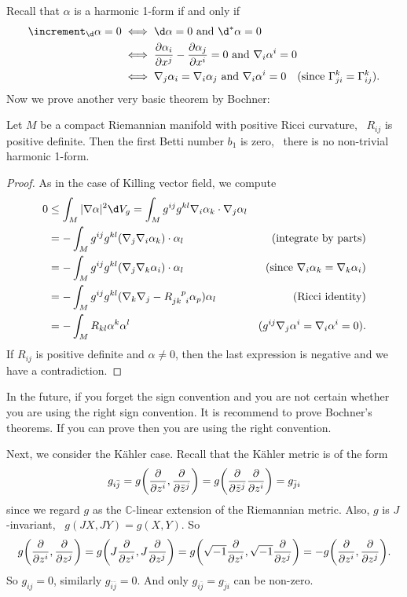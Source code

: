 \documentclass[12pt]{article}
\begin{document}
Recall that \(\alpha\) is a harmonic 1-form if and only if
\begin{align*}
  \lap_{\dd{}}\alpha=0&\iff \dd{\alpha}=0\text{ and }\dd{}^*\alpha=0 \\
  &\iff\pdv{\alpha_i}{x^j}-\pdv{\alpha_j}{x^i}=0\text{ and }\nabla_i\alpha^i=0 \\
  &\iff \nabla_j\alpha_i=\nabla_i \alpha_j\text{ and }\nabla_i \alpha^i=0
  \quad (\text{since }\Gamma_{ji}^k=\Gamma_{ij}^k)
.\end{align*} 
Now we prove another very basic theorem by Bochner:
\begin{theorem}
  Let \(M\) be a compact Riemannian manifold with positive Ricci curvature, \ie\ 
  \(R_{ij}\) is positive definite. Then the first Betti number \(b_1\) is zero,
  \ie\ there is no non-trivial harmonic 1-form.
\end{theorem}
\begin{proof}
  As in the case of Killing vector field, we compute
  \begin{align*}
    0&\le\int_{M}|\nabla \alpha|^2\dd{V_g}=\int_{M}g^{ij}g^{kl}\nabla_i \alpha_k
    \cdot \nabla_j \alpha_l \\
    &=-\int_{M}g^{ij}g^{kl}(\nabla_j \nabla_i \alpha_k)\cdot \alpha_l
    &(\text{integrate by parts}) \\
    &=-\int_{M}g^{ij}g^{kl}(\nabla_j \nabla_k \alpha_i) \cdot \alpha_l
    &(\text{since }\nabla_i\alpha_k=\nabla_k\alpha_i) \\
    &=-\int_{M}g^{ij}g^{kl}(\nabla_k\nabla_j-R\indices{_{jk}^p_i}\alpha_p)
    \alpha_l & (\text{Ricci identity}) \\
    &=-\int_{M}R_{kl}\alpha^k \alpha^l
    &(g^{ij}\nabla_j \alpha^i=\nabla_i \alpha^i=0)
  .\end{align*}
  If \(R_{ij}\) is positive definite and \(\alpha\neq 0\), then the last
  expression is negative and we have a contradiction. 
\end{proof}

In the future, if you forget the sign convention and you are not certain
whether you are using the right sign convention. It is recommend to prove
Bochner's theorems. If you can prove then you are using the right convention.

Next, we consider the Kähler case. Recall that the Kähler metric is of the
form \[
  g_{i\bar{j}}=g\left(\pd{z^i},\pd{\bar{z}^j}\right)=g\left(\pd{\bar{z}^j}
  \pd{z^i}\right)=g_{\bar{j}i}
\] since we regard \(g\) as the \(\mathbb{C}\)-linear extension of the Riemannian
metric. Also, \(g\) is \(J\)-invariant, \ie\ \(g(JX,JY)=g(X,Y)\). So \[
  g\left(\pd{z^i},\pd{z^j}\right)=g\left(J\pd{z^i},J\pd{z^j}\right)
  =g\left(\sqrt{-1}\pd{z^i},\sqrt{-1}\pd{z^j}\right)
  =-g\left(\pd{z^i},\pd{z^j}\right)
.\] So \(g_{ij}=0\), similarly \(g_{\bar{i}\bar{j}}=0\). And only \(g_{i\bar{j}}
=g_{\bar{j}i}\) can be non-zero.
\end{document}
